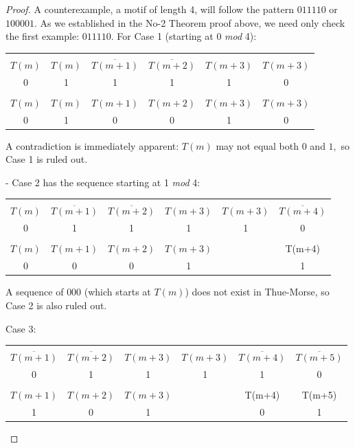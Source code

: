 \documentclass{article}
\begin{document}
\begin{proof}
A counterexample, a motif of length 4, will follow the pattern $011110$ or $100001.$ As we established in the No-2 Theorem proof above, we need only check the first example: $011110.$ For Case 1 (starting at 0 \emph{mod} 4):

\begin{center}
\begin{tabular}{ |c|c|c|c|c|c| } 
 \hline
 &&&&&\\
$T(m)$ & $T(m)$ & $\overline{T(m+1)}$ & $\overline{T(m+2)}$ & $T(m+3)$ & $T(m+3)$ \\ 
0 & 1 & 1 & 1 & 1 & 0 \\
\hline
&&&&&\\
$T(m)$ & $T(m)$ & $T(m+1)$ & $T(m+2)$ & $T(m+3)$ & $T(m+3)$ \\
0 & 1 & 0 & 0 & 1 & 0 \\
 \hline
\end{tabular}
\end{center}

A contradiction is immediately apparent: $T(m)$ may not equal both $0$ and $1,$ so Case 1 is ruled out.

- Case 2 has the sequence starting at 1 \emph{mod} 4:

\begin{center}
\begin{tabular}{ |c|c|c|c|c|c| } 
 \hline
 &&&&&\\
$T(m)$ & $\overline{T(m+1)}$ & $\overline{T(m+2)}$ & $T(m+3)$ & $T(m+3)$ & $\overline{T(m+4)}$ \\ 
0 & 1 & 1 & 1 & 1 & 0 \\
\hline
&&&&&\\
$T(m)$ & $T(m+1)$ & $T(m+2)$ & $T(m+3)$ & & T(m+4) \\
0 & 0 & 0 & 1 & & 1 \\
 \hline
\end{tabular}
\end{center}

A sequence of $000$ (which starts at $T(m)$) does not exist in Thue-Morse, so Case 2 is also ruled out.

Case 3:

\begin{center}
\begin{tabular}{ |c|c|c|c|c|c| } 
 \hline
 &&&&&\\
$\overline{T(m+1)}$ & $\overline{T(m+2)}$ & $T(m+3)$ & $T(m+3)$ & $\overline{T(m+4)}$ & $\overline{T(m+5)}$ \\ 
0 & 1 & 1 & 1 & 1 & 0 \\
\hline
&&&&&\\
$T(m+1)$ & $T(m+2)$ & $T(m+3)$ & & T(m+4) & T(m+5) \\
1 & 0 & 1 & & 0 & 1 \\
 \hline
\end{tabular}
\end{center}


\end{proof}
\end{document}

